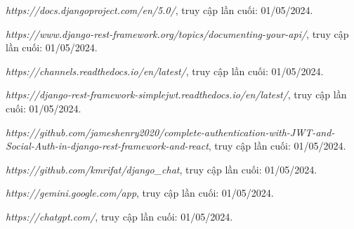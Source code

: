 \documentclass[a4paper]{article}
\begin{document}
\newpage
\begin{thebibliography}{8}
\textit{https://docs.djangoproject.com/en/5.0/}, truy cập lần cuối: 01/05/2024.

\textit{https://www.django-rest-framework.org/topics/documenting-your-api/}, truy cập lần cuối: 01/05/2024.

\textit{https://channels.readthedocs.io/en/latest/}, truy cập lần cuối: 01/05/2024.

\textit{https://django-rest-framework-simplejwt.readthedocs.io/en/latest/}, truy cập lần cuối: 01/05/2024.

\textit{https://github.com/jameshenry2020/complete-authentication-with-JWT-and-Social-Auth-in-django-rest-framework-and-react}, truy cập lần cuối: 01/05/2024.

\textit{https://github.com/kmrifat/django\_chat}, truy cập lần cuối: 01/05/2024.

\textit{https://gemini.google.com/app}, truy cập lần cuối: 01/05/2024.

\textit{https://chatgpt.com/}, truy cập lần cuối: 01/05/2024.
\end{thebibliography}
\end{document}
